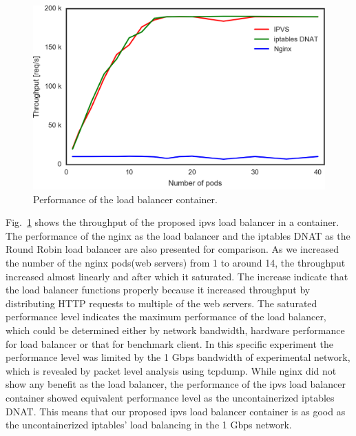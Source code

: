 \begin{figure}[bt]
  \includegraphics[width=0.9\columnwidth]{Figs/ipvs-iptables-nginx}
  \caption{Performance of the load balancer container.}
  \label{fig:ipvs-iptables-nginx}
\end{figure}


Fig.~\ref{fig:ipvs-iptables-nginx} shows the throughput of the proposed ipvs load balancer in a container.
The performance of the nginx as the load balancer and the iptables DNAT as the Round Robin load balancer are also presented for comparison.
As we increased the number of the nginx pods(web servers) from 1 to around 14, the throughput increased almost linearly and after which it saturated. 
The increase indicate that the load balancer functions properly because it increased throughput by distributing HTTP requests to multiple of the web servers.
The saturated performance level indicates the maximum performance of the load balancer, which could be determined either by network bandwidth, hardware performance for load balancer or that for benchmark client. 
In this specific experiment the performance level was limited by the 1 Gbps bandwidth of experimental network\cite{takahashi2018portable}, which is revealed by packet level analysis using tcpdump.
While nginx did not show any benefit as the load balancer, the performance of the ipvs load balancer container showed equivalent performance level as the uncontainerized iptables DNAT. 
This means that our proposed ipvs load balancer container is as good as the uncontainerized iptables' load balancing in the 1 Gbps network.

